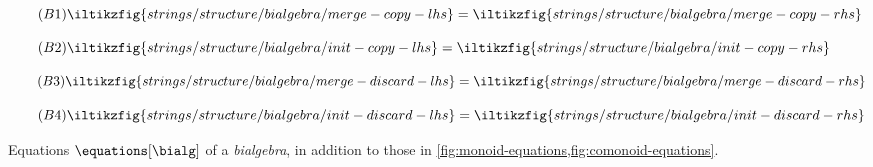 \begin{figure}[p]
    \centering
    \begin{minipage}{0.28\textwidth}
        \begin{equation}
            \tag{\(\mathsf{B1}\)}
            \iltikzfig{strings/structure/bialgebra/merge-copy-lhs}
            =
            \iltikzfig{strings/structure/bialgebra/merge-copy-rhs}
            \label{eq:bialgebra-merge-copy}
        \end{equation}
    \end{minipage}
    \begin{minipage}{0.23\textwidth}
        \begin{equation}
            \tag{\(\mathsf{B2}\)}
            \iltikzfig{strings/structure/bialgebra/init-copy-lhs}
            =
            \iltikzfig{strings/structure/bialgebra/init-copy-rhs}
            \label{eq:bialgebra-init-copy}
        \end{equation}
    \end{minipage}
    \begin{minipage}{0.23\textwidth}
        \begin{equation}
            \tag{\(\mathsf{B3}\)}
            \iltikzfig{strings/structure/bialgebra/merge-discard-lhs}
            =
            \iltikzfig{strings/structure/bialgebra/merge-discard-rhs}
            \label{eq:bialgebra-merge-discard}
        \end{equation}
    \end{minipage}
    \begin{minipage}{0.2\textwidth}
        \begin{equation}
            \tag{\(\mathsf{B4}\)}
            \iltikzfig{strings/structure/bialgebra/init-discard-lhs}
            =
            \iltikzfig{strings/structure/bialgebra/init-discard-rhs}
            \label{eq:bialgebra-init-discard}
        \end{equation}
    \end{minipage}
    \caption{
        Equations \(\equations[\bialg]\) of a \emph{bialgebra}, in
        addition to those in
        \cref{fig:monoid-equations,fig:comonoid-equations}.
    }
    \label{fig:bialgebra-equations}
\end{figure}
